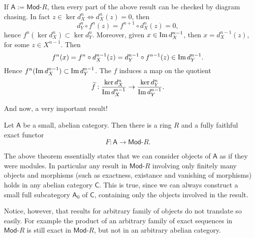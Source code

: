 \begin{rem}[]
	If $\mathsf{A} := \mathsf{Mod}\text{-}R$, then every part of the above result can be
	checked by diagram chasing.
	In fact $z \in \ker d^n_X \iff d^n_X(z) = 0$, then
	\begin{equation}
		d^n_Y \circ f^n(z) = f^{n+1} \circ d^n_X(z) = 0
	,\end{equation} 
	hence $f^n(\ker d^n_X) \subset \ker d^n_Y$.
	Moreover, given $x \in \operatorname{Im} d^{n-1}_X$, then $x = d^{n-1}_X(z)$, for some $z \in X^{n-1}$.
	Then
	\begin{equation}
		f^n(x) = f^n \circ d^{n-1}_X(z) =
		d^{n-1}_Y \circ f^{n-1} (z) \in \operatorname{Im} d^{n-1}_Y
	.\end{equation} 
	Hence $f^n(\operatorname{Im} d^{n-1}_X) \subset \operatorname{Im} d^{n-1}_Y$.
	The $f$ induces a map on the quotient
	\begin{equation}
	\widetilde{f}: \frac{\ker d^n_X}{\operatorname{Im} d_X^{n-1}} \to \frac{\ker d^n_Y}{\operatorname{Im} d_Y^{n-1}}
	.\end{equation} 
\end{rem}

And now, a very important result!
\begin{thm}
	Let $\mathsf{A}$ be a small, abelian category.
	Then there is a ring $R$ and a fully faithful exact functor
	\begin{equation}
	F: \mathsf{A} \to \mathsf{Mod}\text{-}R
	.\end{equation} 
\end{thm}

\begin{rem}[]
	The above theorem essentially states that we can consider objects of $\mathsf{A}$ as if they were modules.
	In particular any result in $\mathsf{Mod}\text{-}R$ involving only finitely many
	objects and morphisms (such as exactness, existance and vanishing of morphisms)
	holds in any abelian category $\mathsf{C}$.
	This is true, since we can always construct a small full subcategory $\mathsf{A}_0$ of $\mathsf{C}$,
	containing only the objects involved in the result.

	Notice, however, that results for arbitrary family of objects do not translate so easily.
	For example the product of an arbitrary family of exact sequences in $\mathsf{Mod}\text{-}R$
	is still exact in $\mathsf{Mod}\text{-}R$, 
	but not in an arbitrary abelian category.
\end{rem}

